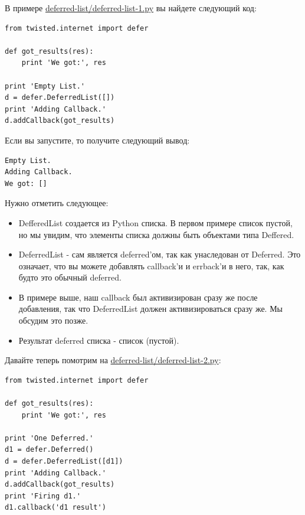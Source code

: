 В примере \href{http://github.com/jdavisp3/twisted-intro/blob/master/deferred-list/deferred-list-1.py#L1}{deferred-list/deferred-list-1.py} вы найдете следующий код:

\begin{scriptsize}\begin{verbatim}
from twisted.internet import defer

def got_results(res):
    print 'We got:', res

print 'Empty List.'
d = defer.DeferredList([])
print 'Adding Callback.'
d.addCallback(got_results)
\end{verbatim}\end{scriptsize}

Если вы запустите, то получите следующий вывод:

\begin{scriptsize}\begin{verbatim}
Empty List.
Adding Callback.
We got: []
\end{verbatim}\end{scriptsize}

Нужно отметить следующее:

\begin{itemize}

\item DefferedList создается из Python списка. В первом примере список 
    пустой, но мы увидим, что элементы списка должны быть объектами 
    типа Deffered.

\item DeferredList - сам является deferred'ом, так как унаследован от Deferred. Это означает, 
    что вы можете добавлять callback'и и errback'и в него, так, как будто 
    это обычный deferred.

\item В примере выше, наш callback был активизирован сразу же 
    после добавления, так что DeferredList должен активизироваться 
    сразу же. Мы обсудим это позже.

\item Результат deferred списка - список (пустой). 

\end{itemize}

Давайте теперь помотрим на 
\href{http://github.com/jdavisp3/twisted-intro/blob/master/deferred-list/deferred-list-2.py#L1}{deferred-list/deferred-list-2.py}:

\begin{scriptsize}\begin{verbatim}
from twisted.internet import defer

def got_results(res):
    print 'We got:', res

print 'One Deferred.'
d1 = defer.Deferred()
d = defer.DeferredList([d1])
print 'Adding Callback.'
d.addCallback(got_results)
print 'Firing d1.'
d1.callback('d1 result')
\end{verbatim}\end{scriptsize}


